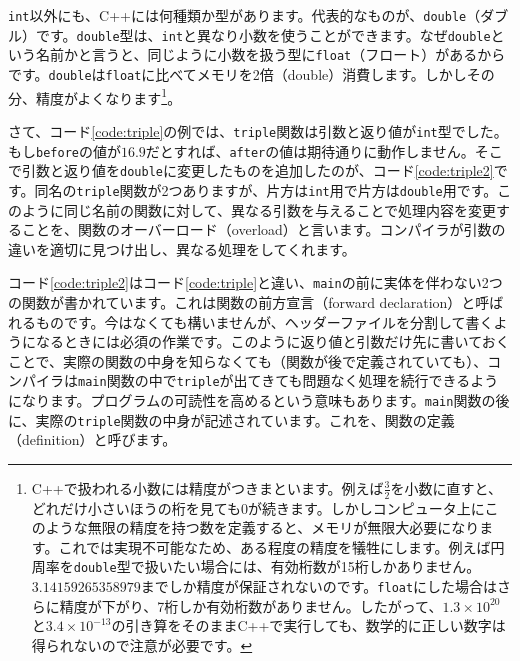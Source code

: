 \texttt{int}以外にも、C++には何種類か型があります。代表的なものが、\texttt{double}（ダブル）です。\texttt{double}型は、\texttt{int}と異なり小数を使うことができます。なぜ\texttt{double}という名前かと言うと、同じように小数を扱う型に\texttt{float}（フロート）があるからです。\texttt{double}は\texttt{float}に比べてメモリを2倍（double）消費します。しかしその分、精度がよくなります\footnote{C++で扱われる小数には精度がつきまといます。例えば$\frac{3}{2}$を小数に直すと、どれだけ小さいほうの桁を見ても0が続きます。しかしコンピュータ上にこのような無限の精度を持つ数を定義すると、メモリが無限大必要になります。これでは実現不可能なため、ある程度の精度を犠牲にします。例えば円周率を\texttt{double}型で扱いたい場合には、有効桁数が15桁しかありません。 $3.14159265358979$までしか精度が保証されないのです。\texttt{float}にした場合はさらに精度が下がり、7桁しか有効桁数がありません。したがって、$1.3\times10^{20}$と$3.4\times10^{-13}$の引き算をそのままC++で実行しても、数学的に正しい数字は得られないので注意が必要です。}。

さて、コード\ref{code:triple}の例では、\texttt{triple}関数は引数と返り値が\texttt{int}型でした。もし\texttt{before}の値が$16.9$だとすれば、\texttt{after}の値は期待通りに動作しません。そこで引数と返り値を\texttt{double}に変更したものを追加したのが、コード\ref{code:triple2}です。同名の\texttt{triple}関数が2つありますが、片方は\texttt{int}用で片方は\texttt{double}用です。このように同じ名前の関数に対して、異なる引数を与えることで処理内容を変更することを、関数のオーバーロード（overload）と言います。コンパイラが引数の違いを適切に見つけ出し、異なる処理をしてくれます。



コード\ref{code:triple2}はコード\ref{code:triple}と違い、\texttt{main}の前に実体を伴わない2つの関数が書かれています。これは関数の前方宣言（forward declaration）と呼ばれるものです。今はなくても構いませんが、ヘッダーファイルを分割して書くようになるときには必須の作業です。このように返り値と引数だけ先に書いておくことで、実際の関数の中身を知らなくても（関数が後で定義されていても）、コンパイラは\texttt{main}関数の中で\texttt{triple}が出てきても問題なく処理を続行できるようになります。プログラムの可読性を高めるという意味もあります。\texttt{main}関数の後に、実際の\texttt{triple}関数の中身が記述されています。これを、関数の定義（definition）と呼びます。

